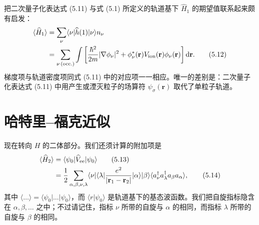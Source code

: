 把二次量子化表达式 (5.11) 与式 (5.1) 所定义的轨道基下 $\widehat{H}_1$ 的期望值联系起来颇有启发：
\begin{align*}
\langle\widehat{H}_1\rangle&=\sum_\nu\langle\nu|\widehat{h}(1)|\nu\rangle n_\nu\\
&=\sum_{\nu\,{\rm (occ.)}}\int\left[\frac{\hbar^2}{2m}|\nabla\phi_\nu|^2+\phi_\nu^*(\mathbf{r})V_{\rm ion}(\mathbf{r})\phi_\nu(\mathbf{r})\right]{\rm d}\mathbf{r}.
\tag{5.12}
\end{align*}
梯度项与轨道密度项同式 (5.11) 中的对应项一一相应。唯一的差别是：二次量子化表达式 (5.11) 中用产生或湮灭粒子的场算符 $\psi_\sigma(\mathbf{r})$ 取代了单粒子轨道。

\section{哈特里–福克近似}

现在转向 $H$ 的二体部分。我们还须计算的附加项是
\begin{align*}
\langle\widehat{H}_2\rangle&=\langle\psi_0|\widehat{V}_{\rm ee}|\psi_0\rangle\tag{5.13}\\
&=\frac{1}{2}\sum_{\alpha,\beta,\nu,\lambda}\langle\nu|\langle\lambda|\frac{e^2}{|\mathbf{r}_1-\mathbf{r}_2|}|\alpha\rangle|\beta\rangle\langle a_\nu^\dagger a_\lambda^\dagger a_\beta a_\alpha\rangle,
\tag{5.14}
\end{align*}
其中 $\langle\ldots\rangle=\langle\psi_0|\ldots|\psi_0\rangle$，而 $\langle r|\psi_0\rangle$ 是轨道基下的基态波函数。我们把自旋指标隐含在 $\alpha,\beta,\ldots$ 之中；不过请记住，指标 $\nu$ 所带的自旋与 $\alpha$ 的相同，而指标 $\lambda$ 所带的自旋与 $\beta$ 的相同。

